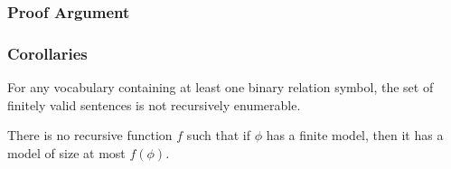 \documentclass{beamer}
\begin{document}
\begin{frame}
  \frametitle{Proof Argument}

  
\end{frame}

\begin{frame}
  \frametitle{Corollaries}

  \begin{corollary}
    For any vocabulary containing at least one binary relation symbol, the set
    of finitely valid sentences is not recursively enumerable.
  \end{corollary}

  \begin{corollary}
    There is no recursive function $f$ such that if $\phi$ has a finite model,
    then it has a model of size at most $f(\phi)$.
  \end{corollary}
  
\end{frame}

\section{}


\end{document}
